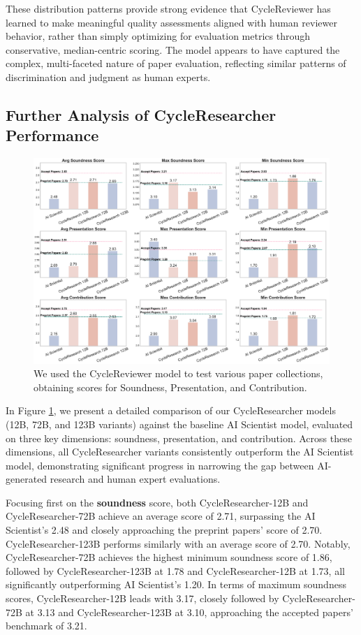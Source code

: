 \documentclass{article} %
\begin{document}
These distribution patterns provide strong evidence that CycleReviewer has learned to make meaningful quality assessments aligned with human reviewer behavior, rather than simply optimizing for evaluation metrics through conservative, median-centric scoring. The model appears to have captured the complex, multi-faceted nature of paper evaluation, reflecting similar patterns of discrimination and judgment as human experts.

\subsection{Further Analysis of CycleResearcher Performance}

\begin{figure}[h]
    \centering
    \includegraphics[width=\textwidth]{combined_charts.pdf}
    \caption{We used the CycleReviewer model to test various paper collections, obtaining scores for Soundness, Presentation, and Contribution.}
    \label{fig:reviewer2}
\end{figure}


In Figure \ref{fig:reviewer2}, we present a detailed comparison of our CycleResearcher models (12B, 72B, and 123B variants) against the baseline AI Scientist model, evaluated on three key dimensions: soundness, presentation, and contribution. Across these dimensions, all CycleResearcher variants consistently outperform the AI Scientist model, demonstrating significant progress in narrowing the gap between AI-generated research and human expert evaluations.

Focusing first on the \textbf{soundness} score, both CycleResearcher-12B and CycleResearcher-72B achieve an average score of 2.71, surpassing the AI Scientist's 2.48 and closely approaching the preprint papers' score of 2.70. CycleResearcher-123B performs similarly with an average score of 2.70. Notably, CycleResearcher-72B achieves the highest minimum soundness score of 1.86, followed by CycleResearcher-123B at 1.78 and CycleResearcher-12B at 1.73, all significantly outperforming AI Scientist's 1.20. In terms of maximum soundness scores, CycleResearcher-12B leads with 3.17, closely followed by CycleResearcher-72B at 3.13 and CycleResearcher-123B at 3.10, approaching the accepted papers' benchmark of 3.21.
\end{document}
